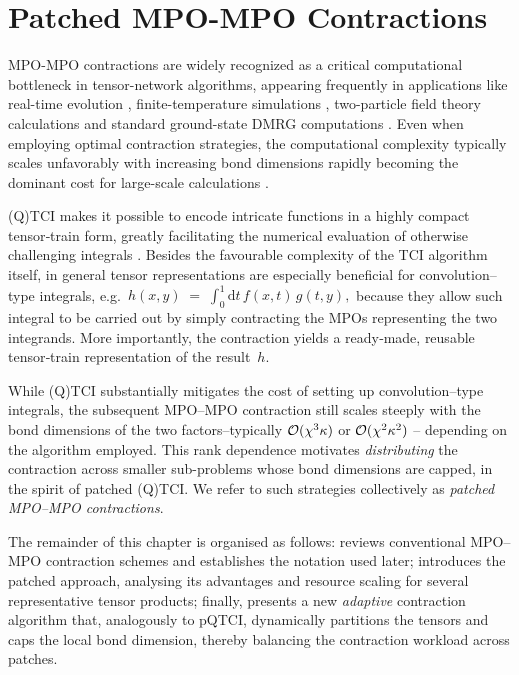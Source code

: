 \chapter{Patched MPO-MPO Contractions}
\label{chap:MPOcontr}
MPO-MPO contractions are widely recognized as a critical computational bottleneck in tensor-network algorithms, appearing frequently in applications like real-time evolution \cite{Paeckel2019}, finite-temperature simulations \cite{Verstraete2004}, two-particle field theory calculations \cite{Rohshap2025} and standard ground-state DMRG computations \cite{Schollwock2011}. Even when employing optimal contraction strategies, the computational complexity typically scales unfavorably with increasing bond dimensions rapidly becoming the dominant cost for large-scale calculations \cite{Schollwock2011,Rohshap2025,Paeckel2019}.

(Q)TCI makes it possible to encode intricate functions in a highly compact tensor‐train form, greatly facilitating the numerical evaluation of otherwise challenging integrals \cite{Fernandez2022,Fernandez2024,Rohshap2025}.  
Besides the favourable complexity of the TCI algorithm itself, in general tensor representations are especially beneficial for convolution–type integrals, e.g.\ $h(x,y)\;=\;\int_{0}^{1}\! \mathrm{d}t\,f(x,t)\,g(t,y),$
because they allow such integral to be carried out by simply contracting the MPOs representing the two integrands. More importantly, the contraction yields a ready‐made, reusable tensor‐train representation of the result~\(h\).

While (Q)TCI substantially mitigates the cost of setting up convolution–type integrals, the subsequent MPO–MPO contraction still scales steeply with the bond dimensions of the two factors--typically $\mathcal{O}(\chi^{3}\kappa)$ or $\mathcal{O}(\chi^{2}\kappa^{2})$ \cite{Stoudenmire2010}-- depending on the algorithm employed.  This rank dependence motivates \emph{distributing} the contraction across smaller sub-problems whose bond dimensions are capped, in the spirit of
patched (Q)TCI.  We refer to such strategies collectively as \emph{patched MPO–MPO contractions}.

The remainder of this chapter is organised as follows:  reviews conventional MPO–MPO contraction schemes and establishes the notation used later;   introduces the patched approach, analysing its advantages and resource scaling for several representative tensor products; finally,  presents a new \emph{adaptive} contraction algorithm that, analogously to pQTCI, dynamically partitions the tensors and caps the local bond dimension, thereby balancing the contraction workload across patches.

